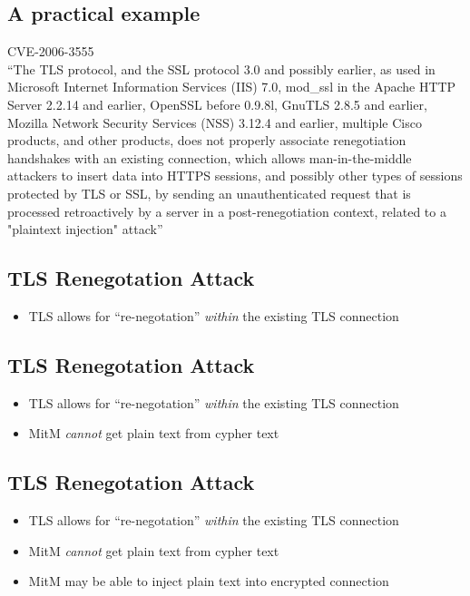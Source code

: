 \documentclass[xga]{xdvislides}
\begin{document}
\subsection{A practical example}
CVE-2006-3555
\\

``The TLS protocol, and the SSL protocol 3.0 and possibly earlier, as used in
Microsoft Internet Information Services (IIS) 7.0, mod\_ssl in the Apache HTTP
Server 2.2.14 and earlier, OpenSSL before 0.9.8l, GnuTLS 2.8.5 and earlier,
Mozilla Network Security Services (NSS) 3.12.4 and earlier, multiple Cisco
products, and other products, does not properly associate renegotiation
handshakes with an existing connection, which allows man-in-the-middle
attackers to insert data into HTTPS sessions, and possibly other types of
sessions protected by TLS or SSL, by sending an unauthenticated request that
is processed retroactively by a server in a post-renegotiation context,
related to a "plaintext injection" attack''
\vspace*{\fill}

\subsection{TLS Renegotation Attack}
\begin{itemize}
	\item TLS allows for ``re-negotation'' {\em within} the existing TLS
		connection
\end{itemize}

\subsection{TLS Renegotation Attack}
\begin{itemize}
	\item TLS allows for ``re-negotation'' {\em within} the existing TLS
		connection
	\item MitM {\em cannot} get plain text from cypher text
\end{itemize}

\subsection{TLS Renegotation Attack}
\begin{itemize}
	\item TLS allows for ``re-negotation'' {\em within} the existing TLS
		connection
	\item MitM {\em cannot} get plain text from cypher text
	\item MitM may be able to inject plain text into encrypted connection
\end{itemize}
\end{document}
